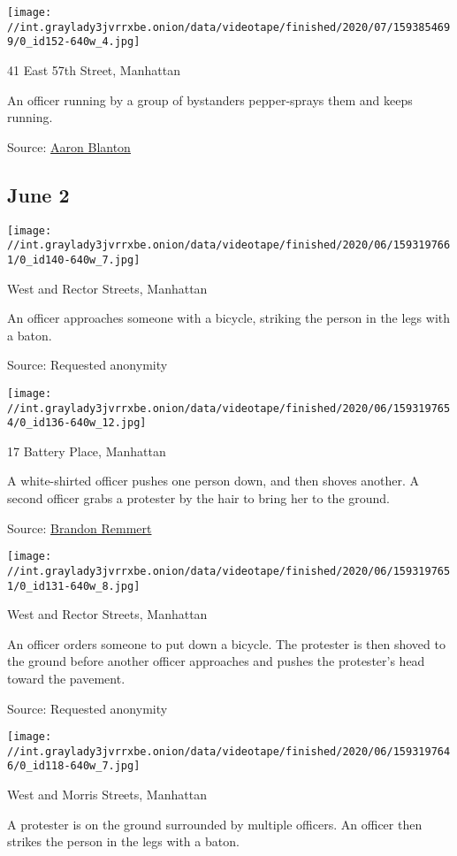 \texttt{[image: //int.graylady3jvrrxbe.onion/data/videotape/finished/2020/07/1593854699/0\_id152-640w\_4.jpg]}

 41 East 57th Street, Manhattan

 An officer running by a group of bystanders pepper-sprays them and
keeps running.

Source:
\href{https://twitter.com/AaronCSBlanton/status/1267676238635769859}{Aaron
Blanton}

\hypertarget{june-2}{%
\subsection{June 2}\label{june-2}}

\texttt{[image: //int.graylady3jvrrxbe.onion/data/videotape/finished/2020/06/1593197661/0\_id140-640w\_7.jpg]}

 West and Rector Streets, Manhattan

 An officer approaches someone with a bicycle, striking the person in
the legs with a baton.

Source: Requested anonymity

\texttt{[image: //int.graylady3jvrrxbe.onion/data/videotape/finished/2020/06/1593197654/0\_id136-640w\_12.jpg]}

 17 Battery Place, Manhattan

 A white-shirted officer pushes one person down, and then shoves
another. A second officer grabs a protester by the hair to bring her to
the ground.

Source:
\href{twitter.com/protest_nyc/status/1268248720291893248}{Brandon
Remmert}

\texttt{[image: //int.graylady3jvrrxbe.onion/data/videotape/finished/2020/06/1593197651/0\_id131-640w\_8.jpg]}

 West and Rector Streets, Manhattan

 An officer orders someone to put down a bicycle. The protester is then
shoved to the ground before another officer approaches and pushes the
protester's head toward the pavement.

Source: Requested anonymity

\texttt{[image: //int.graylady3jvrrxbe.onion/data/videotape/finished/2020/06/1593197646/0\_id118-640w\_7.jpg]}

 West and Morris Streets, Manhattan

 A protester is on the ground surrounded by multiple officers. An
officer then strikes the person in the legs with a baton.

